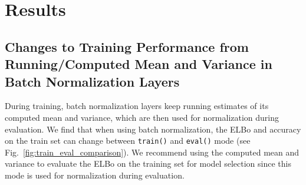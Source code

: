 \section{Results}
\label{sec:results}




\subsection{Changes to Training Performance from Running/Computed Mean and Variance in Batch Normalization Layers}
During training, batch normalization layers keep running estimates of its computed mean and variance, which are then used for normalization during evaluation.
We find that when using batch normalization, the ELBo and accuracy on the train set can change between \texttt{train()} and \texttt{eval()} mode (see Fig.~\ref{fig:train_eval_comparison}).
We recommend using the computed mean and variance to evaluate the ELBo on the training set for model selection since this mode is used for normalization during evaluation.


